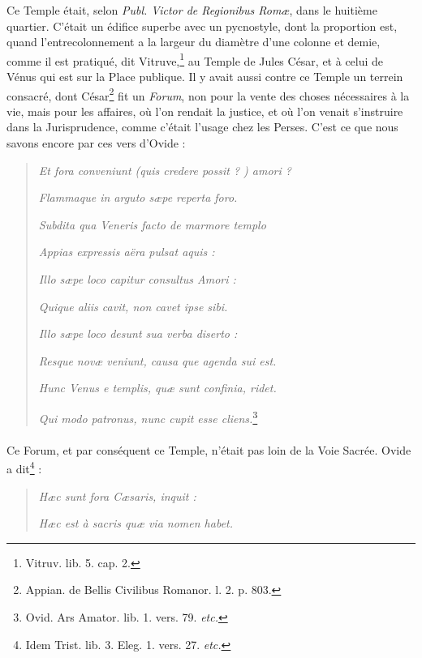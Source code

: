 \documentclass[a4paper, 11pt, oneside, polutonikogreek, french]{article}
\begin{document}
Ce Temple était, selon \emph{Publ. Victor de Regionibus Romæ}, dans le huitième quartier. C'était un édifice superbe avec un pycnostyle, dont la proportion est, quand l'entrecolonnement a la largeur du diamètre d'une colonne et demie, comme il est pratiqué, dit Vitruve,\footnote{Vitruv. lib. 5. cap. 2.} au Temple de Jules César, et à celui de Vénus qui est sur la Place publique. Il y avait aussi contre ce Temple un terrein consacré, dont César\footnote{Appian. de Bellis Civilibus Romanor. l. 2. p. 803.} fit un \emph{Forum}, non pour la vente des choses nécessaires à la vie, mais pour les affaires, où l'on rendait la justice, et où l'on venait s'instruire dans la Jurisprudence, comme c'était l'usage chez les Perses. C'est ce que nous savons encore par ces vers d'Ovide :
\begin{quotation}
\hspace*{5mm}\emph{Et fora conveniunt (quis credere possit ? ) amori ?} 

\hspace*{5mm}\emph{Flammaque in arguto sæpe reperta foro.}

\emph{Subdita qua Veneris facto de marmore templo}

\hspace*{5mm}\emph{Appias expressis aëra pulsat aquis :}

\emph{Illo sæpe loco capitur consultus Amori :}

\hspace*{5mm}\emph{Quique aliis cavit, non cavet ipse sibi.}

\emph{Illo sæpe loco desunt sua verba diserto :}

\hspace*{5mm}\emph{Resque novæ veniunt, causa que agenda sui est.}

\emph{Hunc Venus e templis, quæ sunt confinia, ridet.}

\hspace*{5mm}\emph{Qui modo patronus, nunc cupit esse cliens.}\footnote{Ovid. Ars Amator. lib. 1. vers. 79. \emph{etc.}}
\end{quotation}
\paragraph{}
Ce Forum, et par conséquent ce Temple, n'était pas loin de la Voie Sacrée. Ovide a dit\footnote{Idem Trist. lib. 3. Eleg. 1. vers. 27. \emph{etc.}} :
\begin{quotation}
\hspace*{5mm}\emph{Hæc sunt fora Cæsaris, inquit :}

\emph{Hæc est à sacris quæ via nomen habet.}
\end{quotation}
\end{document}
